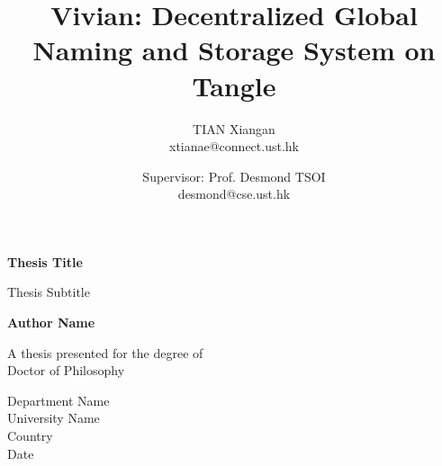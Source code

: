 \documentclass[conference, 10pt]{ieeetran}
\begin{document}
\begin{titlepage}
    \begin{center}
        \vspace*{1cm}
    
        \textbf{Thesis Title}
    
        \vspace{0.5cm}
            Thesis Subtitle
                
        \vspace{1.5cm}
    
        \textbf{Author Name}
    
        \vfill
                
        A thesis presented for the degree of\\
        Doctor of Philosophy
                
        \vspace{0.8cm}
        
                
        Department Name\\
        University Name\\
        Country\\
        Date
                 
        \end{center}
     \end{titlepage}

\title{Vivian: Decentralized Global Naming and Storage System on Tangle}

\author{
    TIAN Xiangan \\
    xtianae@connect.ust.hk
    \and
    Supervisor: Prof. Desmond TSOI \\
    desmond@cse.ust.hk
}

\maketitle
\end{document}
